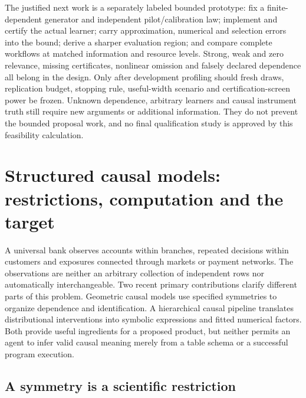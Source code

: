 The justified next work is a separately labeled bounded prototype:
fix a finite-dependent generator and independent pilot/calibration
law; implement and certify the actual learner; carry approximation,
numerical and selection errors into the bound; derive a sharper
evaluation region; and compare complete workflows at matched
information and resource levels. Strong, weak and zero relevance,
missing certificates, nonlinear omission and falsely declared
dependence all belong in the design. Only after development profiling
should fresh draws, replication budget, stopping rule, useful-width
scenario and certification-screen power be frozen. Unknown
dependence, arbitrary learners and causal instrument truth still
require new arguments or additional information. They do not
prevent the bounded proposal work, and no final qualification
study is approved by this feasibility calculation.
\label{exec13:dependent-design-review-end}


\section{Structured causal models: restrictions, computation and the target}
\label{exec23:structured-scope}

A universal bank observes accounts within branches, repeated decisions within
customers and exposures connected through markets or payment networks. The
observations are neither an arbitrary collection of independent rows nor
automatically interchangeable. Two recent primary contributions clarify
different parts of this problem. Geometric causal models use specified
symmetries to organize dependence and identification. A hierarchical causal
pipeline translates distributional interventions into symbolic expressions
and fitted numerical factors. Both provide useful ingredients for a proposed
product, but neither permits an agent to infer valid causal meaning merely
from a table schema or a successful program execution.
\citep{exec23_geometric_models,exec23_hierarchical_pipeline}

\subsection{A symmetry is a scientific restriction}
\label{exec23:structured-symmetry}

